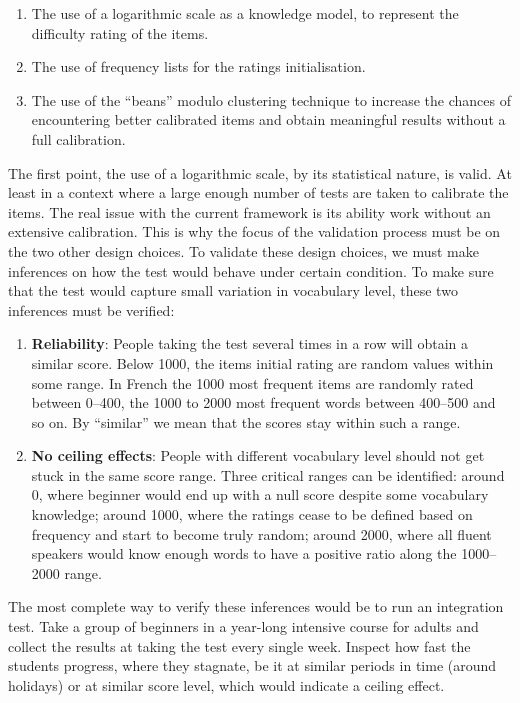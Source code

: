 \begin{enumerate}
  \item The use of a logarithmic scale as a knowledge model, to represent the difficulty rating of the items.
  \item The use of frequency lists for the ratings initialisation.
  \item The use of the ``beans'' modulo clustering technique to increase the chances of encountering better calibrated items and obtain meaningful results without a full calibration.
\end{enumerate}

The first point, the use of a logarithmic scale, by its statistical nature, is valid. At least in a context where a large enough number of tests are taken to calibrate the items. The real issue with the current framework is its ability work without an extensive calibration. This is why the focus of the validation process must be on the two other design choices. To validate these design choices, we must make inferences on how the test would behave under certain condition. To make sure that the test would capture small variation in vocabulary level, these two inferences must be verified:

\begin{enumerate}
  \item \textbf{Reliability}: People taking the test several times in a row will obtain a similar score. Below 1000, the items initial rating are random values within some range. In French the 1000 most frequent items are randomly rated between 0–400, the 1000 to 2000 most frequent words between 400–500 and so on. By ``similar'' we mean that the scores stay within such a range.
  \item \textbf{No ceiling effects}: People with different vocabulary level should not get stuck in the same score range. Three critical ranges can be identified: around 0, where beginner would end up with a null score despite some vocabulary knowledge; around 1000, where the ratings cease to be defined based on frequency and start to become truly random; around 2000, where all fluent speakers would know enough words to have a positive ratio along the 1000–2000 range.
\end{enumerate}

The most complete way to verify these inferences would be to run an integration test. Take a group of beginners in a year-long intensive course for adults and collect the results at taking the test every single week. Inspect how fast the students progress, where they stagnate, be it at similar periods in time (around holidays) or at similar score level, which would indicate a ceiling effect.

